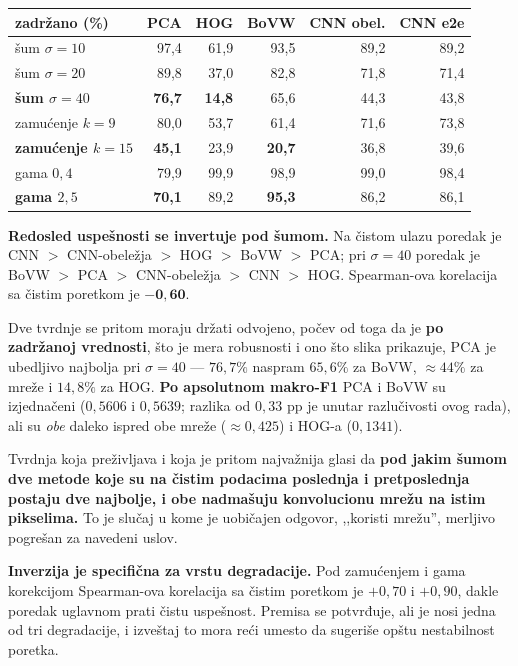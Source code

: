 \documentclass[11pt,a4paper]{article}
\begin{document}
\begin{center}
\begin{tabular}{lrrrrr}
\toprule
\textbf{zadržano (\%)} & \textbf{PCA} & \textbf{HOG} & \textbf{BoVW} & \textbf{CNN obel.} & \textbf{CNN e2e} \\
\midrule
šum $\sigma=10$      & 97,4 & 61,9 & 93,5 & 89,2 & 89,2 \\
šum $\sigma=20$      & 89,8 & 37,0 & 82,8 & 71,8 & 71,4 \\
\textbf{šum $\sigma=40$} & \textbf{76,7} & \textbf{14,8} & 65,6 & 44,3 & 43,8 \\
\midrule
zamućenje $k=9$      & 80,0 & 53,7 & 61,4 & 71,6 & 73,8 \\
\textbf{zamućenje $k=15$} & \textbf{45,1} & 23,9 & \textbf{20,7} & 36,8 & 39,6 \\
\midrule
gama $0{,}4$         & 79,9 & 99,9 & 98,9 & 99,0 & 98,4 \\
\textbf{gama $2{,}5$} & \textbf{70,1} & 89,2 & \textbf{95,3} & 86,2 & 86,1 \\
\bottomrule
\end{tabular}
\end{center}

\textbf{Redosled uspešnosti se invertuje pod šumom.} Na čistom ulazu poredak je
CNN $>$ CNN-obeležja $>$ HOG $>$ BoVW $>$ PCA; pri $\sigma=40$ poredak je
BoVW $>$ PCA $>$ CNN-obeležja $>$ CNN $>$ HOG. Spearman-ova korelacija sa čistim poretkom je
$\mathbf{-0{,}60}$.

Dve tvrdnje se pritom moraju držati odvojeno, počev od toga da je \textbf{po zadržanoj
vrednosti}, što je mera
robusnosti i ono što slika prikazuje, PCA je ubedljivo najbolja pri $\sigma=40$ — $76{,}7\%$
naspram $65{,}6\%$ za BoVW, $\approx 44\%$ za mreže i $14{,}8\%$ za HOG. \textbf{Po apsolutnom
makro-F1} PCA i BoVW su izjednačeni ($0{,}5606$ i $0{,}5639$; razlika od $0{,}33$ pp je unutar
razlučivosti ovog rada), ali su \emph{obe} daleko ispred obe mreže ($\approx 0{,}425$) i HOG-a
($0{,}1341$).

Tvrdnja koja preživljava i koja je pritom najvažnija glasi da \textbf{pod jakim šumom dve
metode koje su na čistim
podacima poslednja i pretposlednja postaju dve najbolje, i obe nadmašuju konvolucionu mrežu na istim
pikselima.} To je slučaj u kome je uobičajen odgovor, ,,koristi mrežu'', merljivo pogrešan
za navedeni uslov.

\textbf{Inverzija je specifična za vrstu degradacije.} Pod zamućenjem i gama korekcijom
Spearman-ova korelacija sa čistim poretkom je $+0{,}70$ i $+0{,}90$, dakle poredak uglavnom
prati čistu uspešnost. Premisa se potvrđuje, ali je nosi jedna od tri degradacije, i izveštaj
to mora reći umesto da sugeriše opštu nestabilnost poretka.
\end{document}
